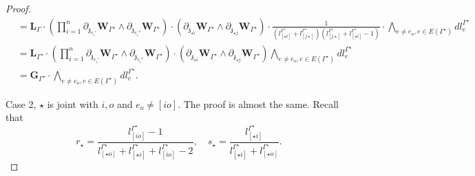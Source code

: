 \documentclass[11pt]{amsart}
\theoremstyle{definition}
\theoremstyle{remark}
\numberwithin{equation}{section}
\begin{document}
\begin{proof}
\begin{align*}
   &=\mathbf{L}_{\Gamma}\cdot\left(\prod^n_{i=1}\partial_{\mathfrak{z}_{e_i'}}\mathbf{W}_{\Gamma^{\star}}\wedge\partial_{\mathfrak{z}_{e_i''}}\mathbf{W}_{\Gamma^{\star}}\right)\cdot  \left( \partial_{\mathfrak{z}_{\star i}}\mathbf{W}_{\Gamma^{\star}}\wedge \partial_{\mathfrak{z}_{\star j}}\mathbf{W}_{\Gamma^{\star}}\right)\cdot \frac{1}{(l^{\Gamma^\star}_{[ \star i]}+l^{\Gamma^\star}_{[ j\star ]})(l^{\Gamma^\star}_{[ j\star]}+l^{\Gamma^\star}_{[ \star i]}-1)}\cdot \bigwedge_{e\neq e_{o},e\in E(\Gamma^{\star})}dl^{\Gamma^{\star}}_{e} \\
   &=\mathbf{L}_{\Gamma^{\star}}\cdot\left(\prod^n_{i=1}\partial_{\mathfrak{z}_{e_i'}}\mathbf{W}_{\Gamma^{\star}}\wedge\partial_{\mathfrak{z}_{e_i''}}\mathbf{W}_{\Gamma^{\star}}\right)\cdot  \left( \partial_{\mathfrak{z}_{\star i}}\mathbf{W}_{\Gamma^{\star}}\wedge \partial_{\mathfrak{z}_{\star j}}\mathbf{W}_{\Gamma^{\star}}\right) \bigwedge_{e\neq e_{o},e\in E(\Gamma^{\star})}dl^{\Gamma^{\star}}_{e}\\
   &=\mathbf{G}_{\Gamma^{\star}}\cdot \bigwedge_{e\neq e_{o},e\in E(\Gamma^{\star})}dl^{\Gamma^{\star}}_{e}.
\end{align*}

Case 2, $\star$ is joint with $i,o$ and $e_o\neq [io]$. The proof is almost the same.
Recall that
$$
 r_{\star}=\frac{l^{\Gamma^\star}_{[ io]}-1}{l^{\Gamma^\star}_{[ \star o]}+l^{\Gamma^\star}_{[ \star i]}+l^{\Gamma^\star}_{[ io]}-2},\quad s_{\star}=\frac{l^{\Gamma^\star}_{[ \star i]}}{l^{\Gamma^\star}_{[ \star i]}+l^{\Gamma^\star}_{[ \star o]}}.
$$



\end{proof}
\end{document}
